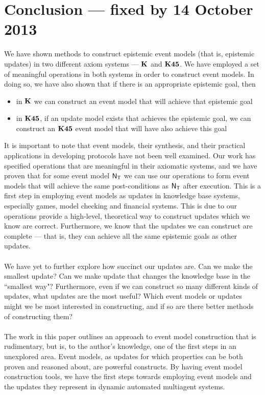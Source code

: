 \section{Conclusion --- fixed by 14 October 2013}

We have shown methods to construct epistemic event models (that is, epistemic updates) in two different axiom systems --- $\bf K$
and $\bf K45$.
We have employed a set of meaningful operations in both systems in order to construct event models.
In doing so, we have also shown that if there is an appropriate epistemic goal, then
\begin{itemize}
	\item in $\bf K$ we can construct an event model that will achieve that epistemic goal
	\item in $\bf K45$, if an update model exists that achieves the epistemic goal, we can construct an
$\bf K45$ event model that will have also achieve this goal
\end{itemize}

It is important to note that event models, their synthesis, and their practical applications in
developing protocols have not been well examined.
Our work has specified operations that are meaningful in their axiomatic systems, and we have proven
that for some event model $\mathrm{\mathsf{N}}_\mathrm{\mathsf{T}}$ we can use our operations to form event models that will
achieve the same post-conditions as $\mathrm{\mathsf{N}}_\mathrm{\mathsf{T}}$ after execution.
This is a first step in employing event models as updates in knowledge base systems, especially
games, model checking and financial systems.
This is due to our operations provide a high-level, theoretical way to construct updates which we know are correct.
Furthermore, we know that the updates we can construct are complete --- that is, they can achieve
all the same epistemic goals as other updates.\\
\\
We have yet to further explore how succinct our updates are.
Can we make the smallest update?
Can we make update that changes the knowledge base in the ``smallest way"?
Furthermore, even if we can construct so many different kinds of updates, what updates are the most
useful?
Which event models or updates might we be most interested in constructing, and if so are there
better methods of constructing them?\\
\\
The work in this paper outlines an approach to event model construction that is rudimentary, but is,
to the author's knowledge, one of the first steps in an unexplored area.
Event models, as updates for which properties can be both proven and reasoned about, are powerful
constructs.
By having event model construction tools, we have the first steps towards employing event models and
the updates they represent in dynamic automated multiagent systems.

